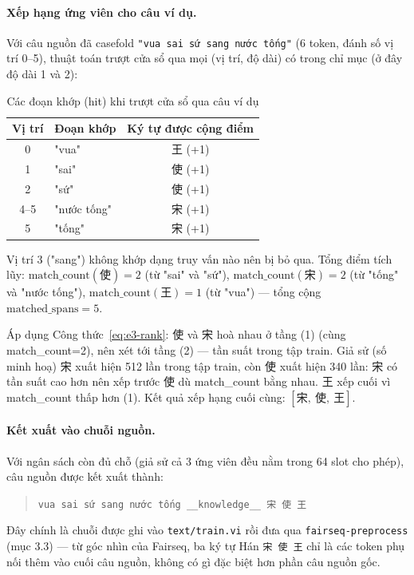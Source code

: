 \paragraph{Xếp hạng ứng viên cho câu ví dụ.} Với câu nguồn đã casefold
\texttt{"vua sai sứ sang nước tống"} (6 token, đánh số vị trí 0--5), thuật toán trượt
cửa sổ qua mọi (vị trí, độ dài) có trong chỉ mục (ở đây độ dài 1 và 2):

\begin{table}[H]
\centering\small
\caption{Các đoạn khớp (hit) khi trượt cửa sổ qua câu ví dụ}
\begin{tabular}{clc}
\toprule
\textbf{Vị trí} & \textbf{Đoạn khớp} & \textbf{Ký tự được cộng điểm} \\
\midrule
0 & "vua" & 王 (+1) \\
1 & "sai" & 使 (+1) \\
2 & "sứ" & 使 (+1) \\
4--5 & "nước tống" & 宋 (+1) \\
5 & "tống" & 宋 (+1) \\
\bottomrule
\end{tabular}
\end{table}

Vị trí 3 ("sang") không khớp dạng truy vấn nào nên bị bỏ qua. Tổng điểm tích lũy:
$\mathrm{match\_count}(使)=2$ (từ "sai" và "sứ"), $\mathrm{match\_count}(宋)=2$ (từ
"tống" và "nước tống"), $\mathrm{match\_count}(王)=1$ (từ "vua") — tổng cộng
$\mathrm{matched\_spans}=5$.

Áp dụng Công thức~\ref{eq:e3-rank}: 使 và 宋 hoà nhau ở tầng (1) (cùng match\_count=2),
nên xét tới tầng (2) — tần suất trong tập train. Giả sử (số minh hoạ) 宋 xuất hiện 512
lần trong tập train, còn 使 xuất hiện 340 lần: 宋 có tần suất cao hơn nên xếp trước 使 dù
match\_count bằng nhau. 王 xếp cuối vì match\_count thấp hơn (1). Kết quả xếp hạng cuối
cùng: $[宋,\ 使,\ 王]$.

\paragraph{Kết xuất vào chuỗi nguồn.} Với ngân sách còn đủ chỗ (giả sử cả 3 ứng viên đều
nằm trong 64 slot cho phép), câu nguồn được kết xuất thành:
\begin{quote}\small
\texttt{vua sai sứ sang nước tống \_\_knowledge\_\_ 宋 使 王}
\end{quote}
Đây chính là chuỗi được ghi vào \texttt{text/train.vi} rồi đưa qua \texttt{fairseq-preprocess}
(mục 3.3) — từ góc nhìn của Fairseq, ba ký tự Hán \texttt{宋 使 王} chỉ là các token phụ
nối thêm vào cuối câu nguồn, không có gì đặc biệt hơn phần câu nguồn gốc.

